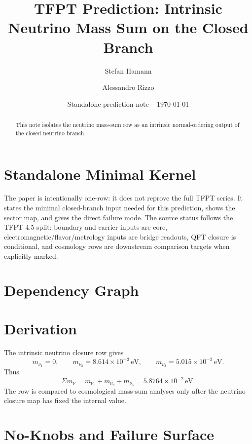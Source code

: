 \documentclass[11pt,a4paper]{article}
\title{\color{tfptblue}\textbf{TFPT Prediction: Intrinsic Neutrino Mass Sum on the Closed Branch}}
\author{Stefan Hamann \and Alessandro Rizzo}
\date{{\normalsize\color{tfptgray}\sffamily Standalone prediction note -- \today}}
\begin{document}
\maketitle

\begin{abstract}
This note isolates the neutrino mass-sum row as an intrinsic normal-ordering output of the closed neutrino branch.
\end{abstract}



\section{Standalone Minimal Kernel}
\MinimalKernelBox

The paper is intentionally one-row: it does not reprove the full TFPT series. It states the minimal closed-branch input needed for this prediction, shows the sector map, and gives the direct failure mode. The source status follows the TFPT 4.5 split: boundary and carrier inputs are core, electromagnetic/flavor/metrology inputs are bridge readouts, QFT closure is conditional, and cosmology rows are downstream comparison targets when explicitly marked.


\section{Dependency Graph}

\section{Derivation}

The intrinsic neutrino closure row gives
\[
m_{\nu_1}=0,
\qquad
m_{\nu_2}=8.614\times10^{-3}\,\mathrm{eV},
\qquad
m_{\nu_3}=5.015\times10^{-2}\,\mathrm{eV}.
\]
Thus
\[
\Sigma m_\nu=m_{\nu_1}+m_{\nu_2}+m_{\nu_3}
=5.8764\times10^{-2}\,\mathrm{eV}.
\]
The row is compared to cosmological mass-sum analyses only after the neutrino closure map has fixed the internal value.


\section{No-Knobs and Failure Surface}
\end{document}
